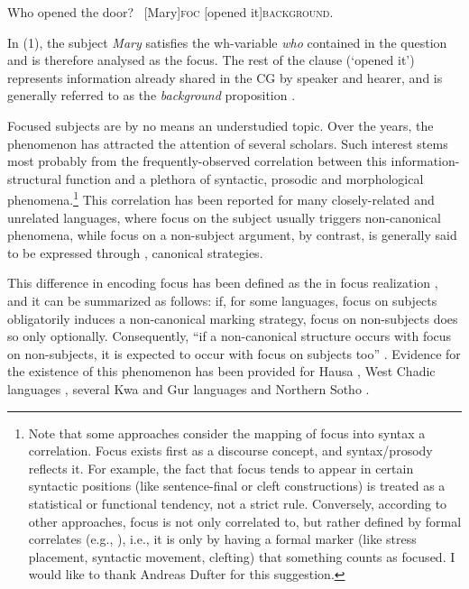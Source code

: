 \ea \label{ex1}
\ea Who opened the door?
\ex \ [Mary]\textsc{foc} \normalsize [opened it]\textsc{background}\normalsize.
\z \z

In (1), the subject \textit{Mary} satisfies the wh-variable \textit{who} contained in the question and is therefore analysed as the focus. The rest of the clause (`opened it') represents information already shared in the CG by speaker and hearer, and is generally referred to as the \textit{background} proposition \parencite{von1982structured, krifka1991compositional, krifka2015structured}.

 Focused subjects are by no means an understudied topic. Over the years, the phenomenon has attracted the attention of several scholars. Such interest stems most probably from the frequently-observed correlation between this information-structural function and a plethora of syntactic, prosodic and morphological phenomena.\footnote{Note that some approaches consider the mapping of focus into syntax a correlation. Focus exists first as a discourse concept, and syntax/prosody reflects it. For example, the fact that focus tends to appear in certain syntactic positions (like sentence-final or cleft constructions) is treated as a statistical or functional tendency, not a strict rule. Conversely, according to other approaches, focus is not only correlated to, but rather defined by formal correlates (e.g., \cite{chomsky1970some}), i.e., it is only by having a formal marker (like stress placement, syntactic movement, clefting) that something counts as focused. I would like to thank Andreas Dufter for this suggestion.} This correlation has been reported for many closely-related and unrelated languages, where focus on the subject usually triggers non-canonical phenomena, while focus on a non-subject argument, by contrast, is generally said to be expressed through , canonical strategies.
 
This difference in encoding focus has been defined as the  in focus realization \parencite{skopeteas2010focus}, and it can be summarized as follows: if, for some languages, focus on subjects obligatorily induces a non-canonical marking strategy, focus on non-subjects does so only optionally. Consequently, 
``if a non-canonical structure occurs with focus on non-subjects, it is expected to occur with focus on subjects too” \parencite[170--171]{skopeteas2010focus}. Evidence for the existence of this phenomenon has been provided for Hausa \parencite{hartmann2007place}, West Chadic languages \parencite{zimmermann2011grammatical}, several Kwa and Gur languages \parencite{fiedler2005out} and Northern Sotho \parencite{zerbian2007investigating}.

